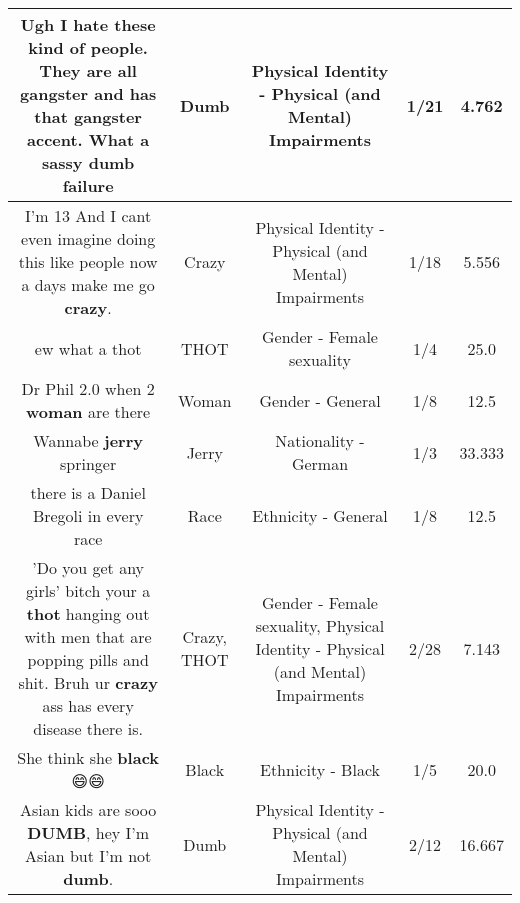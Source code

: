 \documentclass[11pt]{article}
\newlength\mylength
\begin{document}
\begin{center}
\begin{longtable}{|C{.65\mylength}|C{.30\mylength}|C{.12\mylength}|C{.12\mylength}|C{.12\mylength}|}
  \small Ugh I hate these kind of people. They are all gangster and has that gangster accent. What a sassy \textbf{dumb} failure\normalsize   & Dumb & Physical Identity - Physical (and Mental) Impairments & 1/21 & 4.762 \\  \hline
  \small I'm 13 And I cant even imagine doing this like people now a days make me go \textbf{crazy}.\normalsize   & Crazy & Physical Identity - Physical (and Mental) Impairments & 1/18 & 5.556 \\  \hline
  \small ew what a thot\normalsize   & THOT & Gender - Female sexuality & 1/4 & 25.0 \\  \hline
  \small Dr Phil 2.0 when 2 \textbf{woman} are there\normalsize   & Woman & Gender - General & 1/8 & 12.5 \\  \hline
  \small Wannabe \textbf{jerry} springer\normalsize   & Jerry & Nationality - German & 1/3 & 33.333 \\  \hline
  \small there is a Daniel Bregoli in every race\normalsize   & Race & Ethnicity - General & 1/8 & 12.5 \\  \hline
  \small 'Do you get any girls' bitch your a \textbf{thot} hanging out with men that are popping pills and shit. Bruh ur \textbf{crazy} ass has every disease there is.\normalsize   & Crazy, THOT & Gender - Female sexuality, Physical Identity - Physical (and Mental) Impairments & 2/28 & 7.143 \\  \hline
  \small She think she \textbf{black} 😄😄\normalsize   & Black & Ethnicity - Black & 1/5 & 20.0 \\  \hline
  \small Asian kids are sooo \textbf{DUMB}, hey I'm Asian but I'm not \textbf{dumb}.\normalsize   & Dumb & Physical Identity - Physical (and Mental) Impairments & 2/12 & 16.667 \\  \hline

\end{longtable}
\end{center}
\end{document}
